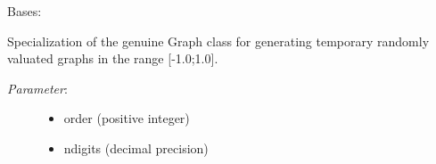 \documentclass[letterpaper,10pt,english]{sphinxmanual}
\begin{document}
\begin{fulllineitems}
\label{techDoc:graphs.RandomValuationGraph}
Bases: {\hyperref[techDoc:graphs.Graph]{\emph{}}}

Specialization of the genuine Graph class for generating temporary
randomly valuated graphs in the range {[}-1.0;1.0{]}.
\begin{description}
\item[{\emph{Parameter}:}] \leavevmode\begin{itemize}
\item {} 
order (positive integer)

\item {} 
ndigits (decimal precision)

\end{itemize}

\end{description}

\end{fulllineitems}

\end{document}
